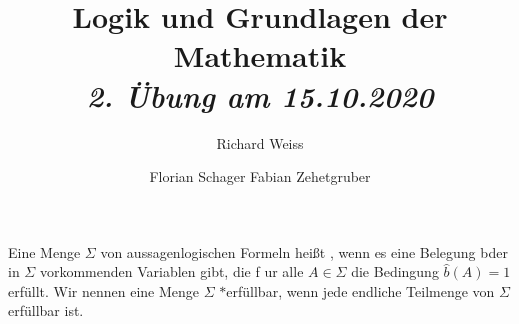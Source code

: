 \documentclass{article}
\title
{
  Logik und Grundlagen der Mathematik \\
  \vspace{4pt}
  \normalsize
  \textit{2. Übung am 15.10.2020}
}
\author
{
  Richard Weiss
  \and
  Florian Schager
  Fabian Zehetgruber
}
\date{}
\begin{document}
\maketitle

Eine Menge $\Sigma$ von aussagenlogischen Formeln heißt , wenn es eine Belegung bder in $\Sigma$ vorkommenden Variablen gibt, die f ur alle $A \in \Sigma$ die Bedingung $\hat{b}(A) = 1$ erfüllt.
Wir nennen eine Menge $\Sigma$ $\ast$erfüllbar, wenn jede endliche Teilmenge von $\Sigma$ erfüllbar ist.














\end{document}
